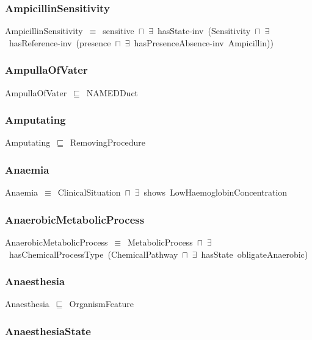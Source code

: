 \documentclass{article}
\begin{document}
\subsubsection*{AmpicillinSensitivity}

AmpicillinSensitivity~\ensuremath{\equiv}~sensitive~\ensuremath{\sqcap}~\ensuremath{\exists}~hasState-inv~(Sensitivity~\ensuremath{\sqcap}~\ensuremath{\exists}~hasReference-inv~(presence~\ensuremath{\sqcap}~\ensuremath{\exists}~hasPresenceAbsence-inv~Ampicillin))

\subsubsection*{AmpullaOfVater}

AmpullaOfVater~\ensuremath{\sqsubseteq}~NAMEDDuct~

\subsubsection*{Amputating}

Amputating~\ensuremath{\sqsubseteq}~RemovingProcedure~

\subsubsection*{Anaemia}

Anaemia~\ensuremath{\equiv}~ClinicalSituation~\ensuremath{\sqcap}~\ensuremath{\exists}~shows~LowHaemoglobinConcentration

\subsubsection*{AnaerobicMetabolicProcess}

AnaerobicMetabolicProcess~\ensuremath{\equiv}~MetabolicProcess~\ensuremath{\sqcap}~\ensuremath{\exists}~hasChemicalProcessType~(ChemicalPathway~\ensuremath{\sqcap}~\ensuremath{\exists}~hasState~obligateAnaerobic)

\subsubsection*{Anaesthesia}

Anaesthesia~\ensuremath{\sqsubseteq}~OrganismFeature~

\subsubsection*{AnaesthesiaState}
\end{document}
